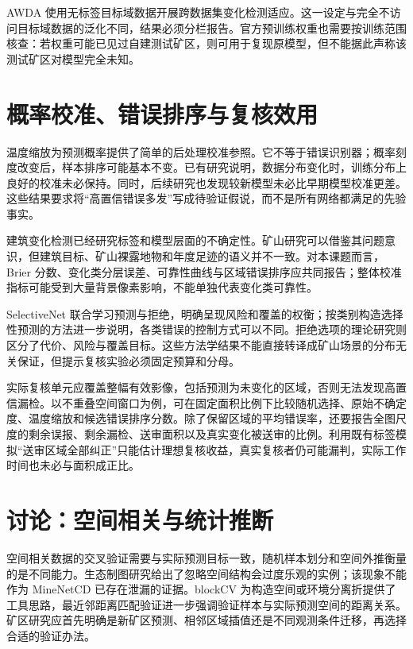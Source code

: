 \documentclass[UTF8,a4paper,11pt]{ctexart}
\begin{document}
AWDA 使用无标签目标域数据开展跨数据集变化检测适应\cite{AWDA2025}。这一设定与完全不访问目标域数据的泛化不同，结果必须分栏报告。官方预训练权重也需要按训练范围核查：若权重可能已见过自建测试矿区，则可用于复现原模型，但不能据此声称该测试矿区对模型完全未知。

\section{概率校准、错误排序与复核效用}
温度缩放为预测概率提供了简单的后处理校准参照\cite{Guo2017Calibration}。它不等于错误识别器；概率刻度改变后，样本排序可能基本不变。已有研究说明，数据分布变化时，训练分布上良好的校准未必保持\cite{Ovadia2019Uncertainty}。同时，后续研究也发现较新模型未必比早期模型校准更差\cite{Minderer2021Calibration}。这些结果要求将“高置信错误多发”写成待验证假说，而不是所有网络都满足的先验事实。

建筑变化检测已经研究标签和模型层面的不确定性\cite{Li2025Uncertainty}。矿山研究可以借鉴其问题意识，但建筑目标、矿山裸露地物和年度足迹的语义并不一致。对本课题而言，Brier 分数、变化类分层误差、可靠性曲线与区域错误排序应共同报告；整体校准指标可能受到大量背景像素影响，不能单独代表变化类可靠性。

SelectiveNet 联合学习预测与拒绝，明确呈现风险和覆盖的权衡\cite{Geifman2019SelectiveNet}；按类别构造选择性预测的方法进一步说明，各类错误的控制方式可以不同\cite{Gangrade2021Selective}。拒绝选项的理论研究则区分了代价、风险与覆盖目标\cite{Franc2023Reject}。这些方法学结果不能直接转译成矿山场景的分布无关保证，但提示复核实验必须固定预算和分母。

实际复核单元应覆盖整幅有效影像，包括预测为未变化的区域，否则无法发现高置信漏检。以不重叠空间窗口为例，可在固定面积比例下比较随机选择、原始不确定度、温度缩放和候选错误排序分数。除了保留区域的平均错误率，还要报告全图尺度的剩余误报、剩余漏检、送审面积以及真实变化被送审的比例。利用既有标签模拟“送审区域全部纠正”只能估计理想复核收益，真实复核者仍可能漏判，实际工作时间也未必与面积成正比。

\section{讨论：空间相关与统计推断}
空间相关数据的交叉验证需要与实际预测目标一致，随机样本划分和空间外推衡量的是不同能力\cite{Roberts2017CV}。生态制图研究给出了忽略空间结构会过度乐观的实例\cite{Ploton2020Spatial}；该现象不能作为 MineNetCD 已存在泄漏的证据。blockCV 为构造空间或环境分离折提供了工具思路\cite{Valavi2019BlockCV}，最近邻距离匹配验证进一步强调验证样本与实际预测空间的距离关系\cite{Mila2022Nearest}。矿区研究应首先明确是新矿区预测、相邻区域插值还是不同观测条件迁移，再选择合适的验证办法。
\end{document}
